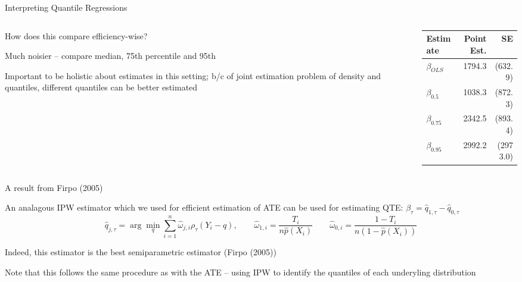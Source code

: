 \documentclass[notes,11pt, aspectratio=169]{beamer}
\newenvironment{wideitemize}{\itemize\addtolength{\itemsep}{10pt}}{\enditemize}
\begin{document}
\begin{frame}{Interpreting Quantile Regressions}
  \begin{columns}[T] %
    \begin{column}{.5\textwidth}
      \begin{wideitemize}
      \item How does this compare efficiency-wise?
      \item Much noisier -- compare median, 75th percentile and 95th
      \item Important to be holistic about estimates in this setting;
        b/c of joint estimation problem of density and quantiles,
        different quantiles can be better estimated
      \end{wideitemize}
    \end{column}%
    \hfill%
    \begin{column}{.5\textwidth}
    \begin{tabular}{lrr}
      Estimate & Point Est. & SE \\
      \midrule
      $\beta_{OLS}$ &  1794.3  & (632.9)\\
      $\beta_{0.5}$ &  1038.3  & (872.3)\\
      $\beta_{0.75}$ & 2342.5  & (893.4)\\
      $\beta_{0.95}$ & 2992.2  & (2973.0)\\
      \end{tabular}
    \end{column}
  \end{columns}
\end{frame}

\begin{frame}{A result from Firpo (2005)}
  \begin{wideitemize}
  \item An analagous IPW estimator which we used for efficient estimation of
    ATE can be used for estimating QTE: $\beta_{\tau} = \hat{q}_{1, \tau} -\hat{q}_{0, \tau}$
    $$\hat{q}_{j, \tau} = \arg\min_{q} \sum_{i=1}^{n}\hat{\omega}_{j,i} \rho_{\tau}(Y_{i} - q), \qquad \hat{\omega}_{1,i} = \frac{T_{i}}{n \hat{p}(X_{i})} \qquad \hat{\omega}_{0,i} = \frac{1-T_{i}}{n (1-\hat{p}(X_{i}))}$$
  \item Indeed, this estimator is the best semiparametric estimator (Firpo (2005))
  \item Note that this follows the same procedure as with the ATE --
    using IPW to identify the quantiles of each underyling distribution
  \end{wideitemize}
\end{frame}
\end{document}
